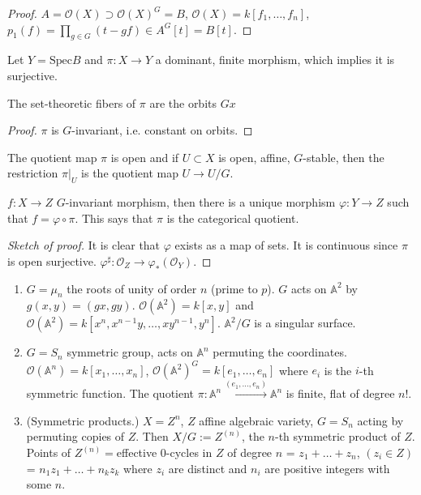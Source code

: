 \begin{proof}
$A=\mathcal{O}(X) \supset \mathcal{O}(X)^G=B$, 
$\mathcal{O}(X)=k[f_1,\ldots,f_n]$,
$p_1(f)=\prod_{g \in G}(t-gf) \in A^G[t]=B[t]$.
\end{proof}

Let $Y = \text{Spec}B$ and $\pi:X\to Y$ a dominant, finite morphism, which
implies it is surjective.

\begin{proposition}
\label{proposition-fibers-of-pi-are-orbits}
The set-theoretic fibers of $\pi$ are the orbits $Gx$
\end{proposition}

\begin{proof}
$\pi$ is $G$-invariant, i.e. constant on orbits.
\end{proof}

\begin{proposition}
\label{proposition-2-second}
The quotient map $\pi$ is open and if $U\subset X$ is open, affine, $G$-stable, 
then the restriction $\pi|_{U}$ is the quotient map $U\to U/G$.
\end{proposition}

\begin{proposition}
\label{proposition-quotient-map-is-categorical-quotient}
$f:X\to Z$ $G$-invariant morphism, then there is a unique morphism $\varphi:Y
\to Z$ such that $f=\varphi \circ\pi$. This says that $\pi$ is the categorical
quotient.
\end{proposition}

\begin{proof}[Sketch of proof]
It is clear that $\varphi$ exists as a map of sets. It is continuous since
$\pi$ is open surjective. $\varphi^\sharp:\mathcal{O}_Z \to
\varphi_*(\mathcal{O}_Y)$.
\end{proof}

\begin{example}
\label{example-quotients}
 \begin{enumerate}
\item $G=\mu_n$ the roots of unity of order $n$ (prime to $p$). $G$ acts on
$\mathbb{A}^2$ by $g(x,y)=(gx,gy)$.  $\mathcal{O}(\mathbb{A}^2)=k[x,y]$ and
$\mathcal{O}(\mathbb{A}^2)=k[x^n,x^{n-1}y,\ldots,xy^{n-1},y^n]$.
$\mathbb{A}^2/G$ is a singular surface.
\item $G=S_n$ symmetric group, acts on $\mathbb{A}^n$ permuting the coordinates.
$\mathcal{O}(\mathbb{A}^n)=k[x_1,\ldots,x_n]$,
$\mathcal{O}(\mathbb{A}^2)^G=k[e_1,\ldots,e_n]$ where $e_i$ is the $i$-th
symmetric function. The quotient
$\pi:\mathbb{A}^n\xrightarrow{(e_1,\ldots,e_n)}\mathbb{A}^n$ is finite, flat of
degree $n!$.
\item (Symmetric products.) $X=Z^n$, $Z$ affine algebraic variety, $G=S_n$
acting by permuting copies of $Z$. Then $X/G:=Z^{(n)}$, the $n$-th symmetric
product of $Z$. Points of $Z^{(n)}=$effective $0$-cycles in $Z$ of degree $n$ =
$z_1+\ldots+z_n$, $(z_i \in Z)$ = $n_1z_1+\ldots+n_kz_k$ where $z_i$ are
distinct and $n_i$ are positive integers with some $n$.
\end{enumerate}
\end{example}

